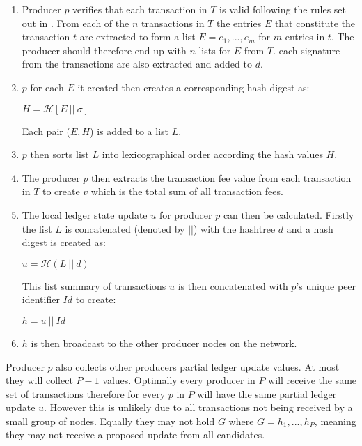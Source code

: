 \begin{enumerate}
\item Producer $p$ verifies that each transaction in $T$ is valid following the rules set out in \cite{transactionvalidator}. From each of the $n$ transactions in $T$ the entries $E$ that constitute the transaction $t$ are extracted to form a list $E = e_1,...,e_m$ for $m$ entries in $t$. The producer should therefore end up with $n$ lists for $E$ from $T$. each signature from the transactions are also extracted and added to $d$.

\item $p$ for each $E$ it created then creates a corresponding hash digest as:
\begin{center}
$H = \mathcal{H}[E~||~\sigma]$
\end{center}

Each pair ($E,H$) is added to a list $L$.

\item $p$ then sorts list $L$ into lexicographical order according the hash values $H$.

\item The producer $p$ then extracts the transaction fee value from each transaction in $T$ to create $v$ which is the total sum of all transaction fees.

\item The local ledger state update $u$ for producer $p$ can then be calculated. Firstly the list $L$ is concatenated (denoted by $||$) with the hashtree $d$ and a hash digest is created as:

\begin{center}
$u = \mathcal{H}(L~||~d)$
\end{center}

This list summary of transactions $u$ is then concatenated with $p$'s unique peer identifier $Id$ to create:

\begin{center}
$h = u ~||~Id$
\end{center}

\item $h$ is then broadcast to the other producer nodes on the network.
\end{enumerate}



Producer $p$ also collects other producers partial ledger update values. At most they will collect $P-1$ values. Optimally every producer in $P$ will receive the same set of transactions therefore for every $p$ in $P$ will have the same partial ledger update $u$. However this is unlikely due to all transactions not being received by a small group of nodes. Equally they may not hold $G$ where $G = h_1,...,h_P$, meaning they may not receive a proposed update from all candidates.
